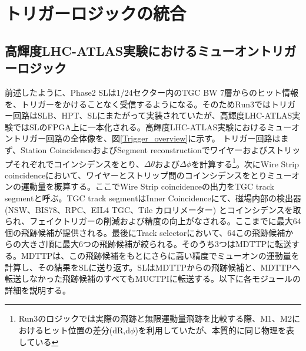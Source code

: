 \chapter{トリガーロジックの統合}
\label{chap_TriggerIntegration}

\section{高輝度LHC-ATLAS実験におけるミューオントリガーロジック}
\label{sec_Phase2TriggerLogic}

前述したように、Phase2 SLは1/24セクター内のTGC BW 7層からのヒット情報を、トリガーをかけることなく受信するようになる。そのためRun3ではトリガー回路はSLB、HPT、SLにまたがって実装されていたが、高輝度LHC-ATLAS実験ではSLのFPGA上に一本化される。高輝度LHC-ATLAS実験におけるミューオントリガー回路の全体像を、図\ref{Trigger_overview}に示す。
トリガー回路はまず、Station CoincidenceおよびSegment reconstructionでワイヤーおよびストリップそれぞれでコインシデンスをとり、$\Delta\theta$および$\Delta\phi$を計算する\footnote{Run3のロジックでは実際の飛跡と無限運動量飛跡を比較する際、M1、M2におけるヒット位置の差分(dR,d$\phi$)を利用していたが、本質的に同じ物理を表している}。次にWire Strip coincidenceにおいて、ワイヤーとストリップ間のコインシデンスをとりミューオンの運動量を概算する。ここでWire Strip coincidenceの出力をTGC track segmentと呼ぶ。TGC track segmentはInner Coincidenceにて、磁場内部の検出器 (NSW、BIS78、RPC、EIL4 TGC、Tile カロリメーター) とコインシデンスを取られ、フェイクトリガーの削減および\pt 精度の向上がなされる。ここまでに最大64個の飛跡候補が提供される。最後にTrack selectorにおいて、64この飛跡候補から\pt の大きさ順に最大6つの飛跡候補が絞られる。そのうち3つはMDTTPに転送する。MDTTPは、この飛跡候補をもとにさらに高い精度でミューオンの運動量を計算し、その結果をSLに送り返す。SLはMDTTPからの飛跡候補と、MDTTPへ転送しなかった飛跡候補のすべてもMUCTPIに転送する。以下に各モジュールの詳細を説明する。



